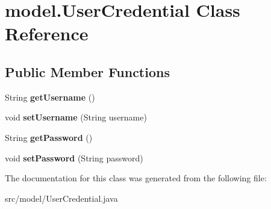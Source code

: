 \hypertarget{classmodel_1_1_user_credential}{}\section{model.\+User\+Credential Class Reference}
\label{classmodel_1_1_user_credential}
\subsection*{Public Member Functions}
\begin{DoxyCompactItemize}
\item 
\mbox{\label{classmodel_1_1_user_credential_a1225759d5e15cd604e89b7b0cfe50360}} 
String {\bfseries get\+Username} ()
\item 
\mbox{\label{classmodel_1_1_user_credential_a51bd441efe07ed739e7bd2a82d25e1f1}} 
void {\bfseries set\+Username} (String username)
\item 
\mbox{\label{classmodel_1_1_user_credential_ad3b213eb739ea9beb0d05acf43cfaf88}} 
String {\bfseries get\+Password} ()
\item 
\mbox{\label{classmodel_1_1_user_credential_adb82e64b4ff7267fe3f059b0166c4496}} 
void {\bfseries set\+Password} (String password)
\end{DoxyCompactItemize}


The documentation for this class was generated from the following file\+:\begin{DoxyCompactItemize}
\item 
src/model/User\+Credential.\+java\end{DoxyCompactItemize}
